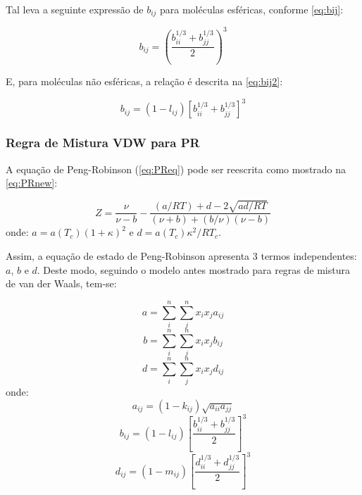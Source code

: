 Tal leva a seguinte expressão de $b_{ij}$ para moléculas esféricas, conforme
\autoref{eq:bij}:

\begin{equation}\label{eq:bij}
b_{ij} = \left ( \frac{b_{ii}^{1/3} + b_{jj}^{1/3}}{2} \right )^3
\end{equation}

E, para moléculas não esféricas, a relação é descrita na \autoref{eq:bij2}:

\begin{equation}\label{eq:bij2}
b_{ij} = (1 - l_{ij})\left [ b_{ii}^{1/3} + b_{jj}^{1/3} \right ]^3
\end{equation}

\subsubsection{Regra de Mistura VDW para PR}

A equação de Peng-Robinson (\autoref{eq:PReq}) pode ser reescrita como mostrado
na \autoref{eq:PRnew}:

\begin{equation}\label{eq:PRnew}
Z = \frac{\nu}{\nu - b} - \frac{(a/RT) + d - 2 \sqrt{ad/RT}}{(\nu + b) +
(b/\nu)(\nu - b)}
\end{equation}
onde: $a = a(T_c)(1 + \kappa)^2$ e $d = a(T_c)\kappa^2/RT_c$.

Assim, a equação de estado de Peng-Robinson apresenta 3 termos
independentes: $a$, $b$ e $d$. Deste modo, seguindo o modelo antes mostrado para
regras de mistura de van der Waals, tem-se:

\begin{equation}\label{eq:PRnew1}
a = \displaystyle\sum_i^n\sum_j^nx_ix_ja_{ij}
\end{equation}
\begin{equation}\label{eq:PRnew2}
b = \displaystyle\sum_i^n\sum_j^nx_ix_jb_{ij}
\end{equation}
\begin{equation}\label{eq:PRnew3}
d = \displaystyle\sum_i^n\sum_j^nx_ix_jd_{ij}
\end{equation}
onde: 
\begin{equation}\label{eq:PRnew4}
a_{ij} = (1 - k_{ij})\sqrt{a_{ii}a_{jj}}
\end{equation}
\begin{equation}\label{eq:PRnew5}
b_{ij} = (1 - l_{ij})\left [ \frac{b_{ii}^{1/3} + b_{jj}^{1/3}}{2} \right]^3
\end{equation}
\begin{equation}\label{eq:PRnew6}
d_{ij} = (1 -m_{ij})\left [ \frac{d_{ii}^{1/3} + d_{jj}^{1/3}}{2} \right]^3
\end{equation}
